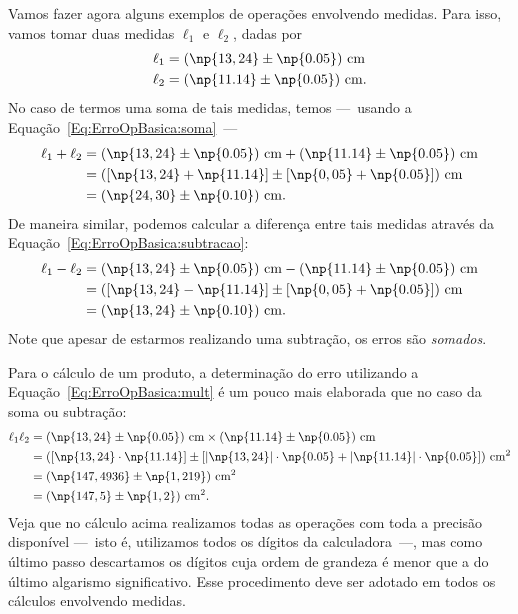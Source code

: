 Vamos fazer agora alguns exemplos de operações envolvendo medidas. Para isso, vamos tomar duas medidas $\ell_1$ e $\ell_2$, dadas por
\begin{align}
    \ell_1 &= (\np{13,24} \pm \np{0.05})~\rm{cm} \\
    \ell_2 &= (\np{11.14} \pm \np{0.05})~\rm{cm}.
\end{align}
%
No caso de termos uma soma de tais medidas, temos ---~usando a Equação~\eqref{Eq:ErroOpBasica:soma}~--- 
\begin{align}
    \ell_1 + \ell_2 &= (\np{13,24} \pm \np{0.05})~\rm{cm} + (\np{11.14} \pm \np{0.05})~\rm{cm} \\
    &= ([\np{13,24} + \np{11.14}] \pm [\np{0,05} + \np{0.05}])~\rm{cm} \\
    &= (\np{24,30} \pm \np{0.10})~\rm{cm}.
\end{align}
%
De maneira similar, podemos calcular a diferença entre tais medidas através da Equação~\eqref{Eq:ErroOpBasica:subtracao}:
\begin{align}
    \ell_1 - \ell_2 &= (\np{13,24} \pm \np{0.05})~\rm{cm} - (\np{11.14} \pm \np{0.05})~\rm{cm} \\
    &= ([\np{13,24} - \np{11.14}] \pm [\np{0,05} + \np{0.05}])~\rm{cm} \\
    &= (\np{13,24} \pm \np{0.10})~\rm{cm}.
\end{align}
%
Note que apesar de estarmos realizando uma subtração, os erros são \emph{somados}.

Para o cálculo de um produto, a determinação do erro utilizando a Equação~\eqref{Eq:ErroOpBasica:mult} é um pouco mais elaborada que no caso da soma ou subtração:
\begin{align}
    \ell_1 \ell_2 &= (\np{13,24} \pm \np{0.05})~\rm{cm} \times (\np{11.14} \pm \np{0.05})~\rm{cm} \\
    &= ([\np{13,24} \cdot \np{11.14}] \pm [|\np{13,24}|\cdot\np{0.05} + |\np{11.14}|\cdot\np{0.05}])~\rm{cm}^2 \\
    &= (\np{147,4936} \pm \np{1,219})~\rm{cm}^2 \\
    &= (\np{147,5} \pm \np{1,2})~\rm{cm}^2.
\end{align}
%
Veja que no cálculo acima realizamos todas as operações com toda a precisão disponível ---~isto é, utilizamos todos os dígitos da calculadora~---, mas como último passo descartamos os dígitos cuja ordem de grandeza é menor que a do último algarismo significativo. Esse procedimento deve ser adotado em todos os cálculos envolvendo medidas.

